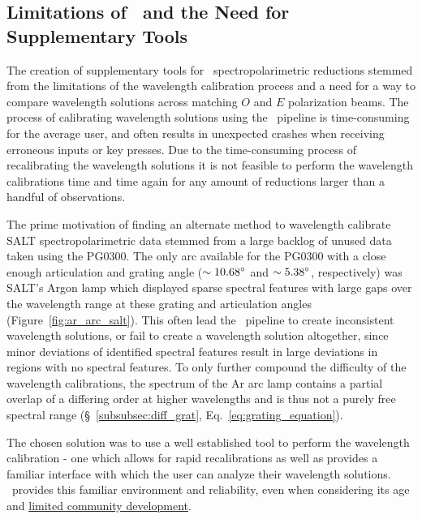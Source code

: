 \subsection{Limitations of \polsalt\ and the Need for Supplementary Tools} \label{subsec:polsalt_limits}

The creation of supplementary tools for \polsalt\ spectropolarimetric reductions stemmed from the limitations of the wavelength calibration process and a need for a way to compare wavelength solutions across matching $O$ and $E$ polarization beams. The process of calibrating wavelength solutions using the \polsalt\ pipeline is time-consuming for the average user, and often results in unexpected crashes when receiving erroneous inputs or key presses. Due to the time-consuming process of recalibrating the wavelength solutions it is not feasible to perform the wavelength calibrations time and time again for any amount of reductions larger than a handful of observations.

The prime motivation of finding an alternate method to wavelength calibrate \gls{SALT} spectropolarimetric data stemmed from a large backlog of unused data taken using the PG$0300$. The only arc available for the PG$0300$ with a close enough articulation and grating angle ($\sim 10.68\hbox{$^\circ$}$ and $\sim 5.38\hbox{$^\circ$}$, respectively) was \gls{SALT}'s Argon lamp which displayed sparse spectral features with large gaps over the wavelength range at these grating and articulation angles (Figure~\ref{fig:ar_arc_salt}). This often lead the \polsalt\ pipeline to create inconsistent wavelength solutions, or fail to create a wavelength solution altogether, since minor deviations of identified spectral features result in large deviations in regions with no spectral features. To only further compound the difficulty of the wavelength calibrations, the spectrum of the Ar arc lamp contains a partial overlap of a differing order at higher wavelengths and is thus not a purely free spectral range (\S~\ref{subsubsec:diff_grat}, Eq.~\ref{eq:grating_equation}).

The chosen solution was to use a well established tool to perform the wavelength calibration - one which allows for rapid recalibrations as well as provides a familiar interface with which the user can analyze their wavelength solutions. \iraf\ provides this familiar environment and reliability, even when considering its age and \href{https://github.com/iraf-community/iraf}{limited community development}.

